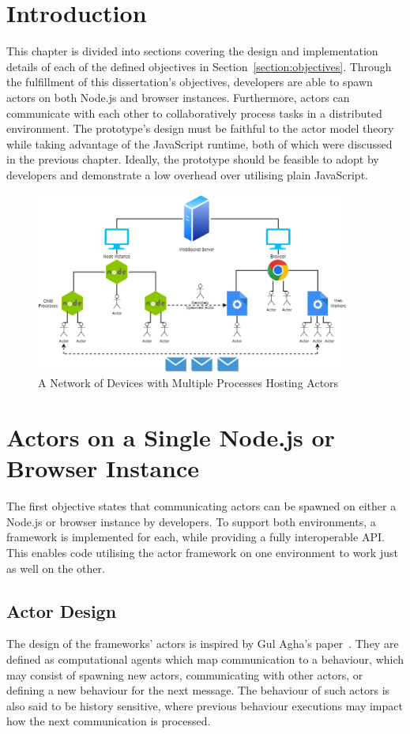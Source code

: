 \documentclass[oneside]{um-fict}
\begin{document}
\section{Introduction}

This chapter is divided into sections covering the design and implementation details of each of the defined objectives in Section~\ref{section:objectives}. Through the fulfillment of this dissertation's objectives, developers are able to spawn actors on both Node.js and browser instances. Furthermore, actors can communicate with each other to collaboratively process tasks in a distributed environment. The prototype's design must be faithful to the actor model theory while taking advantage of the JavaScript runtime, both of which were discussed in the previous chapter. Ideally, the prototype should be feasible to adopt by developers and demonstrate a low overhead over utilising plain JavaScript.

\begin{figure}[H]
    \begin{centering}
        \includegraphics[width=390px]{resources/network.png}
        \caption{A Network of Devices with Multiple Processes Hosting Actors}
    \end{centering}\label{fig:network}
\end{figure}
\section{Actors on a Single Node.js or Browser Instance}
The first objective states that communicating actors can be spawned on either a Node.js or browser instance by developers. To support both environments, a framework is implemented for each, while providing a fully interoperable API. This enables code utilising the actor framework on one environment to work just as well on the other.
\subsection{Actor Design}
The design of the frameworks' actors is inspired by Gul Agha's paper~\cite{agha1985actors}. They are defined as computational agents which map communication to a behaviour, which may consist of spawning new actors, communicating with other actors, or defining a new behaviour for the next message. The behaviour of such actors is also said to be history sensitive, where previous behaviour executions may impact how the next communication is processed.
\end{document}

